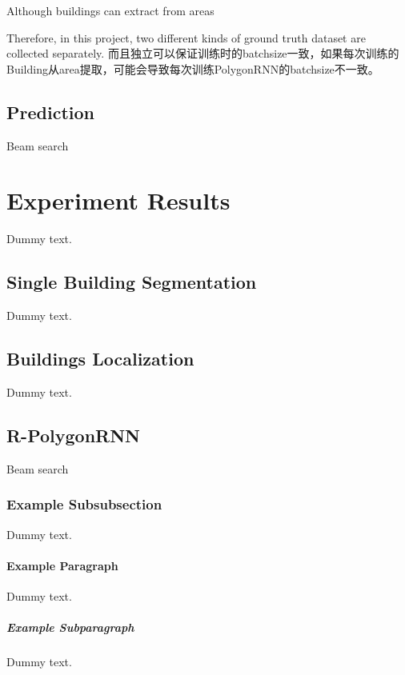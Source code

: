 Although buildings can extract from areas

Therefore, in this project, two different kinds of ground truth dataset are collected separately.
而且独立可以保证训练时的batchsize一致，如果每次训练的Building从area提取，可能会导致每次训练PolygonRNN的batchsize不一致。

\subsection{Prediction}

Beam search

\section{Experiment Results}\label{expres}

Dummy text.

\subsection{Single Building Segmentation}

Dummy text.

\subsection{Buildings Localization}

Dummy text.

\subsection{R-PolygonRNN}

Beam search


\subsubsection{Example Subsubsection}

Dummy text.

\paragraph{Example Paragraph}

Dummy text.

\subparagraph{Example Subparagraph}

Dummy text.

